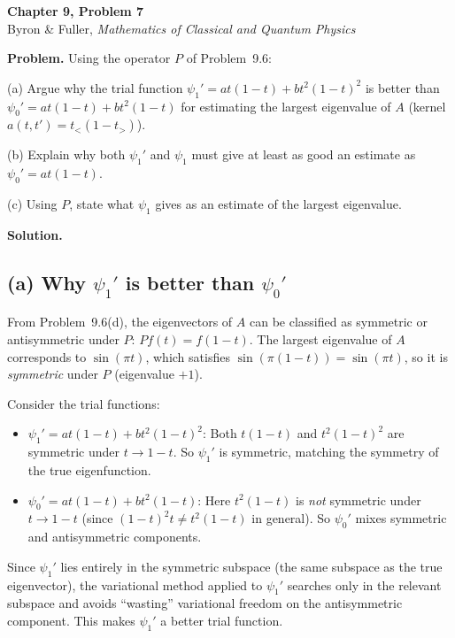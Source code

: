 \documentclass[12pt]{article}
\begin{document}
\begin{center}
{\Large\bfseries Chapter 9, Problem 7}\\[6pt]
Byron \& Fuller, \textit{Mathematics of Classical and Quantum Physics}
\end{center}

\bigskip

\textbf{Problem.} Using the operator $P$ of Problem~9.6:

(a) Argue why the trial function $\psi_1' = at(1-t) + bt^2(1-t)^2$ is better than $\psi_0' = at(1-t) + bt^2(1-t)$ for estimating the largest eigenvalue of $A$ (kernel $a(t,t') = t_<(1-t_>)$).

(b) Explain why both $\psi_1'$ and $\psi_1$ must give at least as good an estimate as $\psi_0' = at(1-t)$.

(c) Using $P$, state what $\psi_1$ gives as an estimate of the largest eigenvalue.

\bigskip
\textbf{Solution.}

\subsection*{(a) Why $\psi_1'$ is better than $\psi_0'$}

From Problem~9.6(d), the eigenvectors of $A$ can be classified as symmetric or antisymmetric under $P$: $Pf(t) = f(1-t)$. The largest eigenvalue of $A$ corresponds to $\sin(\pi t)$, which satisfies $\sin(\pi(1-t)) = \sin(\pi t)$, so it is \emph{symmetric} under $P$ (eigenvalue $+1$).

Consider the trial functions:
\begin{itemize}
\item $\psi_1' = at(1-t) + bt^2(1-t)^2$: Both $t(1-t)$ and $t^2(1-t)^2$ are symmetric under $t \to 1-t$. So $\psi_1'$ is symmetric, matching the symmetry of the true eigenfunction.
\item $\psi_0' = at(1-t) + bt^2(1-t)$: Here $t^2(1-t)$ is \emph{not} symmetric under $t \to 1-t$ (since $(1-t)^2 t \neq t^2(1-t)$ in general). So $\psi_0'$ mixes symmetric and antisymmetric components.
\end{itemize}

Since $\psi_1'$ lies entirely in the symmetric subspace (the same subspace as the true eigenvector), the variational method applied to $\psi_1'$ searches only in the relevant subspace and avoids ``wasting'' variational freedom on the antisymmetric component. This makes $\psi_1'$ a better trial function.
\end{document}
